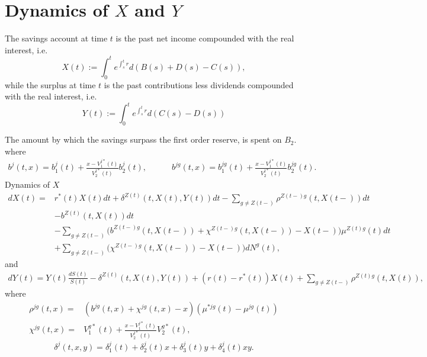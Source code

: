 \documentclass[12pt]{article}
\begin{document}
\appendix
\section{Dynamics of $X$ and $Y$}\label{seq:Dyn}
The savings account at time $t$ is the past net income compounded with the real interest, i.e.
$$
X(t):=\int_0^t e^{\int_s^t r} d(B(s)+D(s)-C(s)),
$$
while the surplus at time $t$ is the past contributions less dividends compounded with the real interest, i.e.
$$
Y(t):=\int_0^t e^{\int_s^t r} d(C(s)-D(s))
$$


The amount by which the savings surpass the first order reserve, is spent on $B_2$. 
where
\begin{gather*}
b^j(t,x)=b_1^j(t)+\frac{x-V_1^{j*}(t)}{V_2^{j*}(t)}b^j_2(t),
\qquad \quad
b^{jg}(t,x)=b_1^{jg}(t)+\frac{x-V_1^{j*}(t)}{V_2^{j*}(t)}b^{jg}_2(t).
\end{gather*}
Dynamics of $X$
\begin{align*}
dX(t)=&
r^*(t)X(t)dt
 +\delta^{Z(t)}(t,X(t),Y(t))  dt- \sum_{g \neq Z(t-)} \rho^{Z(t-)g}(t,X(t-)) dt
 \nonumber 
\\
\nonumber
&- b^{Z(t)}(t,X(t)) dt
\\
&- \sum_{g\neq Z(t-)}\bigg(b^{Z(t-)g}(t,X(t-))+\chi^{Z(t-)g}(t,X(t-))-X(t-) \bigg) \mu^{Z(t)g}(t)dt
\\
&+ \sum_{g\neq Z(t-)}\bigg(\chi^{Z(t-)g}(t,X(t-))-X(t-) \bigg)  dN^g(t),
\end{align*}
and
\begin{align*}
dY(t)=Y(t)\frac{dS(t)}{S(t)}-\delta^{Z(t)}(t,X(t),Y(t)) + (r(t)-r^*(t)) X(t) + \sum_{g \neq Z(t-)} \rho^{Z(t)g}(t,X(t)),
\end{align*}
where
\begin{align*}
\rho^{jg}(t,x)=&(b^{jg}(t,x)+ \chi^{jg}(t,x)-x) (\mu^{*jg}(t)-\mu^{jg}(t))
\\
\chi^{jg}(t,x)=& V^{g*}_1(t) + \frac{x-V^{j*}_1(t)}{V^{j*}_2(t)}V^{g*}_2(t),
\end{align*}
\begin{equation}
\delta^j(t,x,y)=\delta_1^j(t)+\delta_2^j(t)x+\delta_3^j(t)y+\delta_4^j(t)xy.
\end{equation}
\end{document}
